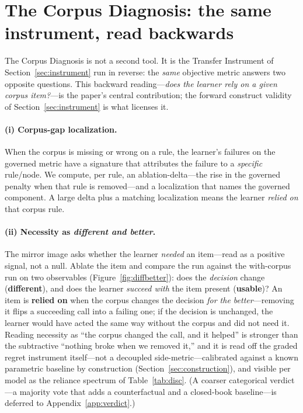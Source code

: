 \documentclass{article}
\begin{document}
\section{The Corpus Diagnosis: the same instrument, read backwards}
\label{sec:diagnosis}
The Corpus Diagnosis is not a second tool. It is the Transfer Instrument of
Section~\ref{sec:instrument} run in reverse: the \emph{same} objective metric answers two
opposite questions. This backward reading---\emph{does the learner rely on a given corpus item?}---is
the paper's central contribution; the forward construct validity of Section~\ref{sec:instrument} is
what licenses it.

\paragraph{(i) Corpus-gap localization.} When the corpus is missing or wrong on a rule, the
learner's failures on the governed metric have a signature that attributes the failure to a
\emph{specific} rule/node. We compute, per rule, an ablation-delta---the rise in the
governed penalty when that rule is removed---and a localization that names the governed
component. A large delta plus a matching localization means the learner \emph{relied on}
that corpus rule.

\paragraph{(ii) Necessity as \emph{different and better}.} The mirror image asks whether the learner
\emph{needed} an item---read as a positive signal, not a null. Ablate the item and compare the run against
the with-corpus run on two observables (Figure~\ref{fig:diffbetter}): does the \emph{decision} change
(\textbf{different}), and does the learner \emph{succeed with} the item present (\textbf{usable})? An item
is \textbf{relied on} when the corpus changes the decision \emph{for the better}---removing it flips a
succeeding call into a failing one; if the decision is unchanged, the learner would have acted the same way
without the corpus and did not need it. Reading necessity as ``the corpus changed the call, and it helped''
is stronger than the subtractive ``nothing broke when we removed it,'' and it is read off the graded regret
instrument itself---not a decoupled side-metric---calibrated against a known parametric baseline by
construction (Section~\ref{sec:construction}), and visible per model as the reliance spectrum of
Table~\ref{tab:disc}. (A coarser categorical verdict---a majority vote that adds a counterfactual and a
closed-book baseline---is deferred to Appendix~\ref{app:verdict}.)
\end{document}
